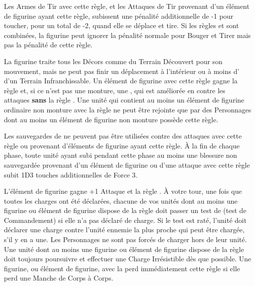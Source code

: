 
Les Armes de Tir avec cette règle, et les Attaques de Tir provenant d'un élément de figurine ayant cette règle, subissent une pénalité additionnelle de -1 pour toucher, pour un total de -2, quand elle se déplace et tire. Si les règles \unwieldy{} et \quicktofire{} sont combinées, la figurine peut ignorer la pénalité normale pour Bouger et Tirer mais pas la pénalité de cette règle.


La figurine traite tous les Décors comme du Terrain Découvert pour son mouvement, mais ne peut pas finir un déplacement à l'intérieur ou à moins d' d'un Terrain Infranchissable. Un élément de figurine avec cette règle gagne la règle \magicalattacks{} et, si ce n'est pas une monture, une , qui est améliorée en  contre les attaques \textbf{sans} la règle \magicalattacks{}. Une unité qui contient au moins un élément de figurine ordinaire non monture avec la règle \ethereal{} ne peut être rejointe que par des Personnages dont au moins un élément de figurine non monture possède cette règle.


Les sauvegardes de \regeneration{} ne peuvent pas être utilisées contre des attaques avec cette règle ou provenant d'éléments de figurine ayant cette règle. À la fin de chaque phase, toute unité ayant subi pendant cette phase au moins une blessure non sauvegardée provenant d'un élément de figurine ou d'une attaque avec cette règle subit 1D3 touches additionnelles de Force 3.


L'élément de figurine gagne +1 Attaque et la règle \immunetopsychology{}. À votre tour, une fois que toutes les charges ont été déclarées, chacune de vos unités dont au moins une figurine ou élément de figurine dispose de la règle \frenzy{} doit passer un test de \frenzy{} (test de Commandement) si elle n'a pas déclaré de charge. Si le test est raté, l'unité doit déclarer une charge contre l'unité ennemie la plus proche qui peut être chargée, s'il y en a une. Les Personnages ne sont pas forcés de charger hors de leur unité. Une unité dont au moins une figurine ou élément de figurine dispose de la règle \frenzy{} doit toujours poursuivre et effectuer une Charge Irrésistible dès que possible. Une figurine, ou élément de figurine, avec la \frenzy{} perd immédiatement cette règle si elle perd une Manche de Corps à Corps.

